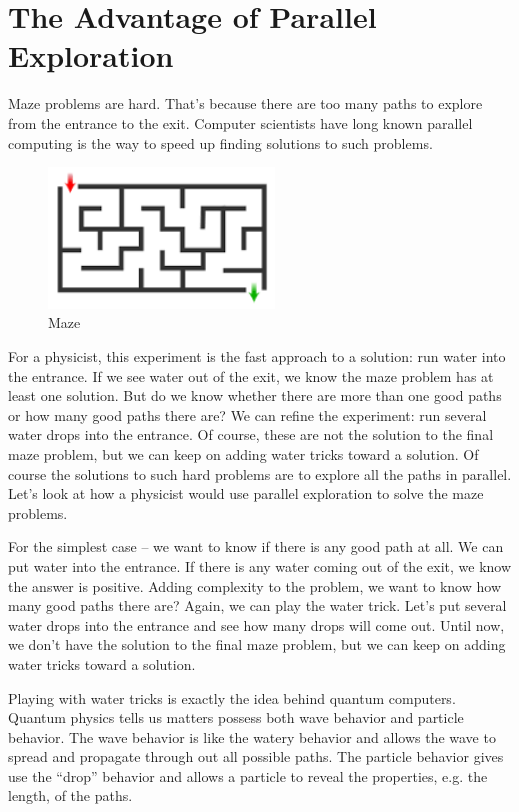 \documentclass{book}
\begin{document}
\section{The Advantage of Parallel Exploration}
Maze problems are hard. That's because there are too many paths to explore from the entrance to the exit. Computer scientists have long known parallel computing is the way to speed up finding solutions to such problems.

\begin{figure}[ht]
\includegraphics[width=6cm]{maze.png}
\caption{Maze}
\label{Maze}
\end{figure}

For a physicist, this experiment is the fast approach to a solution: run water into the entrance. If we see water out of the exit, we know the maze problem has at least one solution. But do we know whether there are more than one good paths or how many good paths there are? We can refine the experiment: run several water drops into the entrance. Of course, these are not the solution to the final maze problem, but we can keep on adding water tricks toward a solution.
Of course the solutions to such hard problems are to explore all the paths in parallel. Let’s look at how a physicist would use parallel exploration to solve the maze problems.

For the simplest case – we want to know if there is any good path at all. We can put water into the entrance. If there is any water coming out of the exit, we know the answer is positive. Adding complexity to the problem, we want to know how many good paths there are? Again, we can play the water trick. Let’s put several water drops into the entrance and see how many drops will come out. Until now, we don't have the solution to the final maze problem, but we can keep on adding water tricks toward a solution.

Playing with water tricks is exactly the idea behind quantum computers. Quantum physics tells us matters possess both wave behavior and particle behavior. The wave behavior is like the watery behavior and allows the wave to spread and propagate through out all possible paths. The particle behavior gives use the “drop” behavior and allows a particle to reveal the properties, e.g. the length, of the paths.
\end{document}
